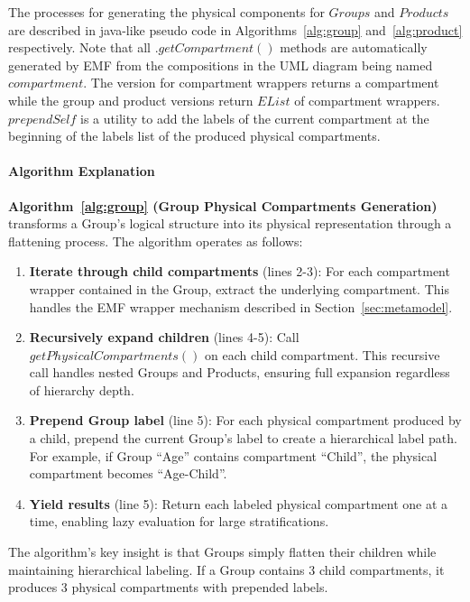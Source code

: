 The processes for generating the physical components for $Groups$ and $Products$ are described in java-like pseudo code in Algorithms~\ref{alg:group} and~\ref{alg:product} respectively. Note that all $.getCompartment()$ methods are automatically generated by EMF from the compositions in the UML diagram being named $compartment$. The version for compartment wrappers returns a compartment while the group and product versions return $EList$ of compartment wrappers. $prependSelf$ is a utility to add the labels of the current compartment at the beginning of the labels list of the produced physical compartments.

\paragraph{Algorithm Explanation}

\textbf{Algorithm~\ref{alg:group} (Group Physical Compartments Generation)} transforms a Group's logical structure into its physical representation through a flattening process. The algorithm operates as follows:
\begin{enumerate}
    \item \textbf{Iterate through child compartments} (lines 2-3): For each compartment wrapper contained in the Group, extract the underlying compartment. This handles the EMF wrapper mechanism described in Section~\ref{sec:metamodel}.
    \item \textbf{Recursively expand children} (lines 4-5): Call $getPhysicalCompartments()$ on each child compartment. This recursive call handles nested Groups and Products, ensuring full expansion regardless of hierarchy depth.
    \item \textbf{Prepend Group label} (line 5): For each physical compartment produced by a child, prepend the current Group's label to create a hierarchical label path. For example, if Group ``Age'' contains compartment ``Child'', the physical compartment becomes ``Age-Child''.
    \item \textbf{Yield results} (line 5): Return each labeled physical compartment one at a time, enabling lazy evaluation for large stratifications.
\end{enumerate}
The algorithm's key insight is that Groups simply flatten their children while maintaining hierarchical labeling. If a Group contains 3 child compartments, it produces 3 physical compartments with prepended labels.

